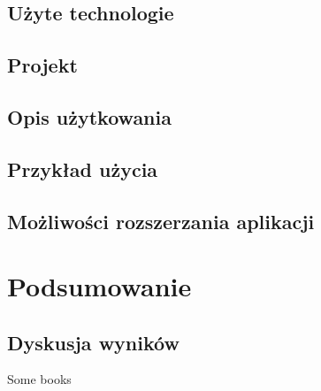\documentclass[12pt]{report}
\begin{document}
\section{Użyte technologie}
\section{Projekt}
\section{Opis użytkowania}
\section{Przykład użycia}
\section{Możliwości rozszerzania aplikacji}
\chapter{Podsumowanie}
\section{Dyskusja wyników}

\begin{thebibliography}{99}
	 {Some books}
\end{thebibliography}

\listoffigures

\listoftables
\end{document}
